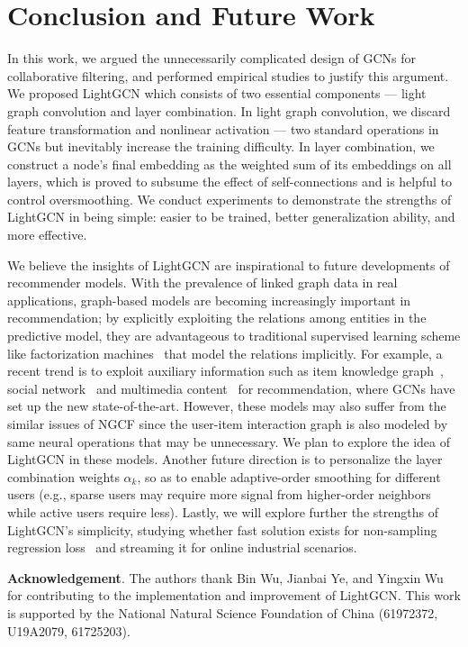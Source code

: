 \section{Conclusion and Future Work} \label{sec:conclusion}
In this work, we argued the unnecessarily complicated design of GCNs for collaborative filtering, and performed empirical studies to justify this argument. 
We proposed LightGCN which consists of two essential components --- light graph convolution and layer combination. 
In light graph convolution, we 
discard feature transformation and nonlinear activation --- two standard operations in GCNs but inevitably increase the training difficulty. In layer combination, we construct a node's final embedding as the weighted sum of its embeddings on all layers, which is proved to subsume the effect of self-connections and is helpful to control oversmoothing. 
We conduct experiments to demonstrate the strengths of LightGCN in being simple: easier to be trained, better generalization ability, and more effective. 

We believe the insights of LightGCN are inspirational to future developments of recommender models. With the prevalence of linked graph data in real applications, graph-based models are becoming increasingly important in recommendation;
by explicitly exploiting the relations among entities in the predictive model, they are advantageous to traditional supervised learning scheme like factorization machines~\cite{FM,NFM} that model the relations implicitly. 
For example, a recent trend is to exploit auxiliary information such as item knowledge graph~\cite{KGAT}, social network~\cite{GCNSocial} and multimedia content~\cite{MMGCN} for recommendation, where GCNs have set up the new state-of-the-art. 
However, these models may also suffer from the similar issues of NGCF since the user-item interaction graph is also modeled by same neural operations that may be unnecessary. We plan to explore the idea of LightGCN in these models. Another future direction is to personalize the layer combination weights $\alpha_k$, so as to enable adaptive-order smoothing for different users (e.g., sparse users may require more signal from higher-order neighbors while active users require less). Lastly, we will explore further the strengths of LightGCN's simplicity, studying whether fast solution exists for non-sampling regression loss~\cite{he2019fast} and streaming it for online industrial scenarios. 

\noindent\textbf{Acknowledgement}. The authors thank Bin Wu, Jianbai Ye, and Yingxin Wu for contributing to the implementation and improvement of LightGCN. This work is supported by the National Natural Science Foundation of China (61972372, U19A2079, 61725203).